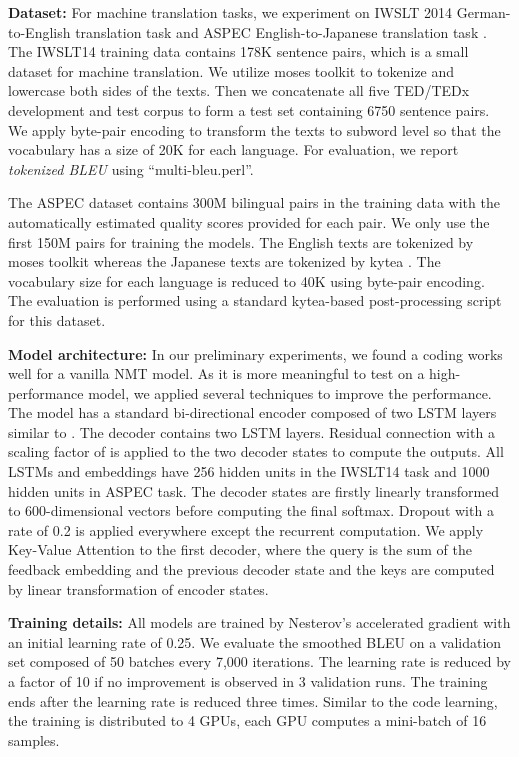 \documentclass{article} \usepackage{iclr2018_conference_review,times}
\begin{document}
{\bf Dataset:} \: For machine translation tasks, we experiment on IWSLT 2014 German-to-English translation task \citep{cettolo2014report} and ASPEC English-to-Japanese translation task \citep{NAKAZAWA16.621}. The IWSLT14 training data contains 178K sentence pairs, which is a small dataset for machine translation. We utilize moses toolkit \citep{Koehn2007MosesOS} to tokenize and lowercase both sides of the texts. Then we concatenate all five TED/TEDx development and test corpus to form a test set containing 6750 sentence pairs. We apply byte-pair encoding \citep{Sennrich2016NeuralMT} to transform the texts to subword level so that the vocabulary has a size of 20K for each language. For evaluation, we report {\it tokenized BLEU} using ``multi-bleu.perl''.

The ASPEC dataset contains 300M bilingual pairs in the training data with the automatically estimated quality scores provided for each pair. We only use the first 150M pairs for training the models. The English texts are tokenized by moses toolkit whereas the Japanese texts are tokenized by kytea \citep{kytea}. The vocabulary size for each language is reduced to 40K using byte-pair encoding. The evaluation is performed using a standard kytea-based post-processing script for this dataset.


{\bf Model architecture:} \: In our preliminary experiments, we found a  coding works well for a vanilla NMT model. As it is more meaningful to test on a high-performance model, we applied several techniques to improve the performance. The model has a standard bi-directional encoder composed of two LSTM layers similar to \citet{bahdanau2014neural}. The decoder contains two LSTM layers. Residual connection \citep{He2016DeepRL} with a scaling factor of  is applied to the two decoder states to compute the outputs. All LSTMs and embeddings have 256 hidden units in the IWSLT14 task and 1000 hidden units in ASPEC task. The decoder states are firstly linearly transformed to 600-dimensional vectors before computing the final softmax. Dropout with a rate of 0.2 is applied everywhere except the recurrent computation. We apply Key-Value Attention \citep{Miller2016KeyValueMN} to the first decoder, where the query is the sum of the feedback embedding and the previous decoder state and the keys are computed by linear transformation of encoder states.

{\bf Training details:} \: All models are trained by Nesterov's accelerated gradient \citep{nesterov1983method} with an initial learning rate of 0.25. We evaluate the smoothed BLEU \citep{smoothed_bleu} on a validation set composed of 50 batches every 7,000 iterations. The learning rate is reduced by a factor of 10 if no improvement is observed in 3 validation runs. The training ends after the learning rate is reduced three times. Similar to the code learning, the training is distributed to 4 GPUs, each GPU computes a mini-batch of 16 samples.
\end{document}
